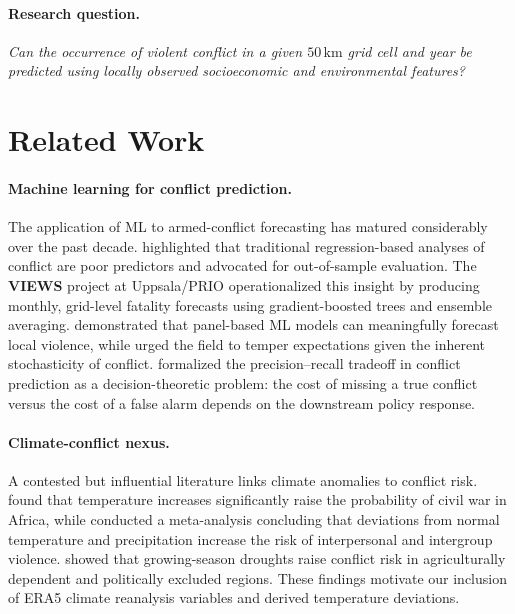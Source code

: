 \documentclass[11pt,a4paper]{article}
\begin{document}
\paragraph{Research question.}
\textit{Can the occurrence of violent conflict in a given $50\,\mathrm{km}$ grid cell and year be predicted using locally observed socioeconomic and environmental features?}

\section{Related Work}

\paragraph{Machine learning for conflict prediction.}
The application of ML to armed-conflict forecasting has matured considerably over the past decade. \textcite{ward2010perils} highlighted that traditional regression-based analyses of conflict are poor predictors and advocated for out-of-sample evaluation. The \textbf{VIEWS} project at Uppsala/PRIO \parencite{hegre2024views} operationalized this insight by producing monthly, grid-level fatality forecasts using gradient-boosted trees and ensemble averaging. \textcite{blair2020predicting} demonstrated that panel-based ML models can meaningfully forecast local violence, while \textcite{cederman2017predicting} urged the field to temper expectations given the inherent stochasticity of conflict. \textcite{mueller2022hard} formalized the precision--recall tradeoff in conflict prediction as a decision-theoretic problem: the cost of missing a true conflict versus the cost of a false alarm depends on the downstream policy response.

\paragraph{Climate-conflict nexus.}
A contested but influential literature links climate anomalies to conflict risk. \textcite{burke2009warming} found that temperature increases significantly raise the probability of civil war in Africa, while \textcite{hsiang2013quantifying} conducted a meta-analysis concluding that deviations from normal temperature and precipitation increase the risk of interpersonal and intergroup violence. \textcite{vonuexkull2016civil} showed that growing-season droughts raise conflict risk in agriculturally dependent and politically excluded regions. These findings motivate our inclusion of ERA5 climate reanalysis variables and derived temperature deviations.
\end{document}
